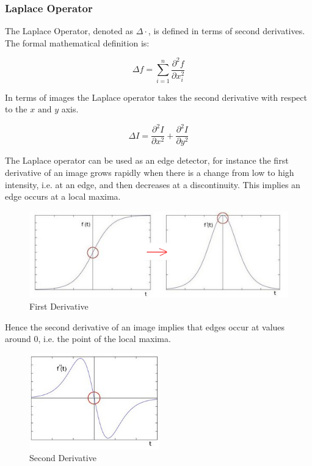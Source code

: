\documentclass{article}
\theoremstyle{definition}
\theoremstyle{remark}
\begin{document}
\subsubsection{Laplace Operator}

The Laplace Operator, denoted as $ \Delta \cdot$, is defined in terms of second derivatives. The formal mathematical definition is: 

\begin{equation}
    \Delta f = \sum_{i = 1}^{n} \frac{\partial^2 f}{\partial x_i^2}
\end{equation}

\noindent In terms of images the Laplace operator takes the second derivative  with respect to the $ x \text{ and } y $ axis.

\begin{equation}
    \Delta I = \frac{\partial^2 I}{\partial x^2} + \frac{\partial^2 I}{\partial y^2}
\end{equation}

The Laplace operator can be used as an edge detector, for instance the first derivative of an image grows rapidly when there is a change from low to high intensity, i.e. at an edge, and then decreases at a discontinuity. This implies an edge occurs at a local maxima. 


\begin{figure}[H]
    \centering
    \includegraphics[width=\textwidth]{laplace_first_derv}
    \caption{First Derivative}
    \label{fig:lap_fd}
\end{figure}

Hence the second derivative of an image implies that edges occur at values around 0, i.e. the point of the local maxima.

\begin{figure}[h!]
    \centering
    \includegraphics[width=0.5\textwidth]{laplace_sec_derv}
    \caption{Second Derivative}
    \label{fig:lap_sd}
\end{figure}
\end{document}
